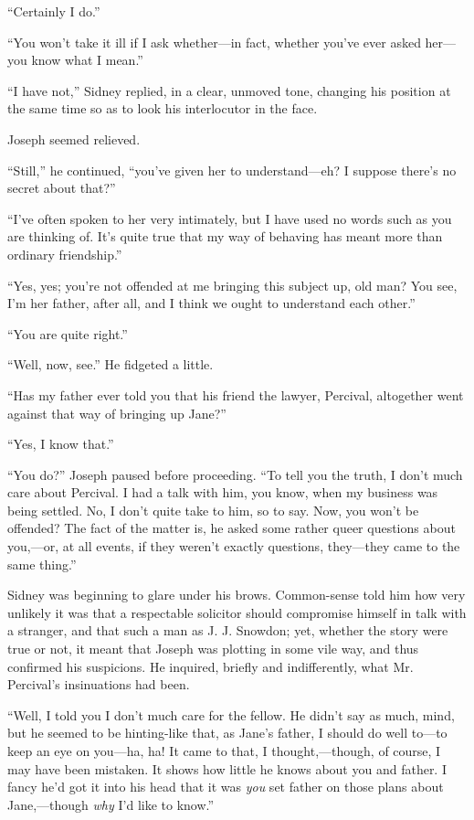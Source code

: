 ``Certainly I do.''

``You won't take it ill if I ask whether---in fact, whether you've ever
asked her---you know what I mean.''

``I have not,'' Sidney replied, in a clear, unmoved tone, changing his
position at the same time so as to look his interlocutor in the face.

Joseph seemed relieved.

{\protect\hypertarget{285}{}{}}``Still,'' he continued, ``you've given
her to understand---eh? I suppose there's no secret about that?''

``I've often spoken to her very intimately, but I have used no words
such as you are thinking of. It's quite true that my way of behaving has
meant more than ordinary friendship.''

``Yes, yes; you're not offended at me bringing this subject up, old man?
You see, I'm her father, after all, and I think we ought to understand
each other.''

``You are quite right.''

``Well, now, see.'' He fidgeted a little.

``Has my father ever told you that his friend the lawyer, Percival,
altogether went against that way of bringing up Jane?''

``Yes, I know that.''

``You do?'' Joseph paused before proceeding. ``To tell you the truth, I
don't much care about Percival. I had a talk with him, you know, when my
business was being settled. No, I don't quite take to him, so to say.
Now, you won't be offended? The fact {\protect\hypertarget{286}{}{}}of
the matter is, he asked some rather queer questions about you,---or, at
all events, if they weren't exactly questions, they---they came to the
same thing.''

Sidney was beginning to glare under his brows. Common-sense told him how
very unlikely it was that a respectable solicitor should compromise
himself in talk with a stranger, and that such a man as J. J. Snowdon;
yet, whether the story were true or not, it meant that Joseph was
plotting in some vile way, and thus confirmed his suspicions. He
inquired, briefly and indifferently, what Mr. Percival's insinuations
had been.

``Well, I told you I don't much care for the fellow. He didn't say as
much, mind, but he seemed to be hinting-like that, as Jane's father, I
should do well to---to keep an eye on you---ha, ha! It came to that, I
thought,---though, of course, I may have been mistaken. It shows how
little he knows about you and father. I fancy he'd got it into his head
that it was \emph{you} set father on those plans about Jane,---though
\emph{why} I'd like to know.''

